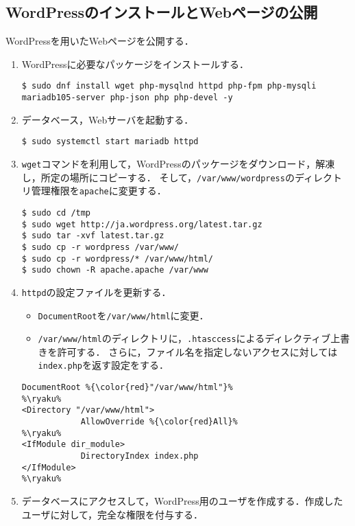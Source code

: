 \subsection{WordPressのインストールとWebページの公開}
WordPressを用いたWebページを公開する．
\begin{enumerate}
    \item WordPressに必要なパッケージをインストールする．
          \begin{lstlisting}
$ sudo dnf install wget php-mysqlnd httpd php-fpm php-mysqli mariadb105-server php-json php php-devel -y
\end{lstlisting}
    \item データベース，Webサーバを起動する．
          \begin{lstlisting}
$ sudo systemctl start mariadb httpd
\end{lstlisting}
    \item \texttt{wget}コマンドを利用して，WordPressのパッケージをダウンロード，解凍し，所定の場所にコピーする．
          そして，\texttt{/var/www/wordpress}のディレクトリ管理権限を\texttt{apache}に変更する．
          \begin{lstlisting}
$ sudo cd /tmp
$ sudo wget http://ja.wordpress.org/latest.tar.gz
$ sudo tar -xvf latest.tar.gz
$ sudo cp -r wordpress /var/www/
$ sudo cp -r wordpress/* /var/www/html/
$ sudo chown -R apache.apache /var/www
    \end{lstlisting}
    \item \texttt{httpd}の設定ファイルを更新する．
          \begin{itemize}
              \item \texttt{DocumentRoot}を\texttt{/var/www/html}に変更．
              \item \texttt{/var/www/html}のディレクトリに，\texttt{.htasccess}によるディレクティブ上書きを許可する．
                    さらに，ファイル名を指定しないアクセスに対しては\texttt{index.php}を返す設定をする．
          \end{itemize}
          \begin{lstlisting}[style=file,caption={\ttfamily /etc/httpd/conf/httpd.conf}]
%\ryaku%
DocumentRoot %{\color{red}"/var/www/html"}%
%\ryaku%
<Directory "/var/www/html">
            AllowOverride %{\color{red}All}%
%\ryaku%
<IfModule dir_module>
            DirectoryIndex index.php
</IfModule>
%\ryaku%
          \end{lstlisting}
    \item データベースにアクセスして，WordPress用のユーザを作成する．作成したユーザに対して，完全な権限を付与する．

\end{enumerate}
